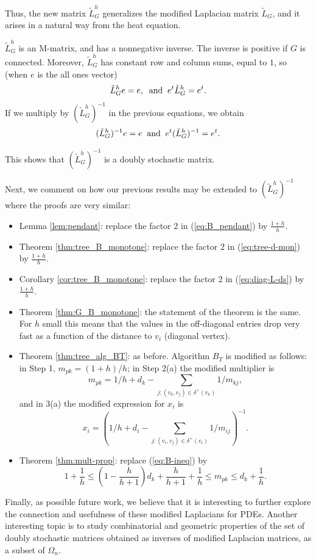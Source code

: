 \documentclass[12pt]{article}
\begin{document}
Thus, the new matrix $\tilde{L}_G^{h}$ generalizes the modified Laplacian matrix $\tilde{L}_G$, and it arises in a natural way from the heat equation.

 $\tilde{L}^{h}_G$ is an M-matrix, and has a nonnegative inverse. The inverse is positive if $G$ is connected.  Moreover, $\tilde{L}^{h}_G$ has constant row and column sums, equal to $1$, so (when $e$ is the all ones vector)  
\[
  \tilde{L}^{h}_G e=e, \;\;\mbox{\rm and}\;\; 
  e^t \tilde{L}^{h}_G=e^t.
\]
 If we multiply by $(\tilde{L}^{h}_G)^{-1}$ in the previous equations, we obtain 
\[
    (\tilde{L}^{h}_G)^{-1} e=e \;\;\mbox{\rm and}\;\; 
    e^t(\tilde{L}^{h}_G)^{-1}=e^t.
\]

This shows that $(\tilde{L}^{h}_G)^{-1}$ is a doubly stochastic matrix.

Next, we comment on how our previous results may be extended to $(\tilde{L}^{h}_G)^{-1}$ where the proofs are very similar:

\begin{itemize}
 \item Lemma \ref{lem:pendant}: replace the factor 2 in (\ref{eq:B_pendant}) by $\frac{1+h}{h}$.
 \item Theorem \ref{thm:tree_B_monotone}: replace the factor 2 in (\ref{eq:tree-d-mon}) by $\frac{1+h}{h}$.  
 \item Corollary \ref{cor:tree_B_monotone}: replace the factor 2  in (\ref{eq:diag-L-ds}) by $\frac{1+h}{h}$.
 \item Theorem \ref{thm:G_B_monotone}: the statement of the theorem is the same. For $h$ small this means that the values in the off-diagonal entries drop very fast as a function of the distance to $v_i$ (diagonal vertex).
 \item Theorem \ref{thm:tree_alg_BT}: as before. Algorithm $B_T$ is modified as follows: 
 in Step 1, $m_{pk} = (1+h)/h$; 
 in Step 2(a) the modified multiplier is 
 \[
    m_{pk}=1/h+d_k-\sum_{j:(v_k,v_j)\in \delta^+(v_k)} 1/m_{kj},
 \]
 and in 3(a) the modified expression for $x_i$ is 
 \[
    x_i=(1/h+d_i-\sum_{j:(v_i,v_j)\in \delta^+(v_i)} 1/m_{ij})^{-1}.
 \]
 \item Theorem \ref{thm:mult-prop}: replace (\ref{eq:B-ineq}) by 
 \[
      1+\frac{1}{h} \le (1-\frac{h}{h+1})d_k +\frac{h}{h+1} +\frac{1}{h}
      \le m_{pk} \le d_k+\frac{1}{h}. 
 \]
 \end{itemize}

\bigskip\bigskip
Finally, as possible future work, we believe that it is interesting to further explore the connection and usefulness of these modified Laplacians for PDEs. 
Another interesting topic is to study combinatorial and geometric properties of the set of doubly stochastic matrices obtained as inverses of modified Laplacian matrices, as a subset of $\Omega_n$.
\end{document}
